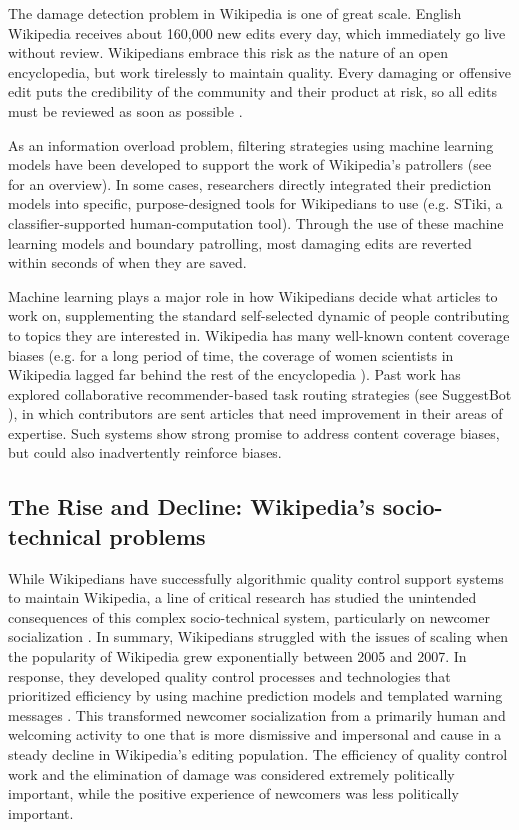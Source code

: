  The damage detection problem in Wikipedia is one of great scale.  English Wikipedia receives about 160,000 new edits every day, which immediately go live without review.  Wikipedians embrace this risk as the nature of an open encyclopedia, but work tirelessly to maintain quality. Every damaging or offensive edit puts the credibility of the community and their product at risk, so all edits must be reviewed as soon as possible \cite{geiger2010work}.

As an information overload problem, filtering strategies using machine learning models have been developed to support the work of Wikipedia's patrollers (see \cite{adler2011wikipedia} for an overview).  In some cases, researchers directly integrated their prediction models into specific, purpose-designed tools for Wikipedians to use (e.g. STiki\cite{west2010stiki}, a classifier-supported human-computation tool). Through the use of these machine learning models and boundary patrolling, most damaging edits are reverted within seconds of when they are saved\cite{geiger2013levee}.

Machine learning plays a major role in how Wikipedians decide what articles to work on, supplementing the standard self-selected dynamic of people contributing to topics they are interested in. Wikipedia has many well-known content coverage biases (e.g. for a long period of time, the coverage of women scientists in Wikipedia lagged far behind the rest of the encyclopedia \cite{halfaker2017interpolating}). Past work has explored collaborative recommender-based task routing strategies (see SuggestBot \cite{cosley2007suggestbot}), in which contributors are sent articles that need improvement in their areas of expertise. Such systems show strong promise to address content coverage biases, but could also inadvertently reinforce biases.

\subsection{The Rise and Decline: Wikipedia's socio-technical problems}
While Wikipedians have successfully algorithmic quality control support systems to maintain Wikipedia, a line of critical research has studied the unintended consequences of this complex socio-technical system, particularly on newcomer socialization  \cite{halfaker2013rise,morgan2013tea,halfaker2014snuggle}.  In summary, Wikipedians struggled with the issues of scaling when the popularity of Wikipedia grew exponentially between 2005 and 2007\cite{halfaker2013rise}.  In response, they developed quality control processes and technologies that prioritized efficiency by using machine prediction models \cite{halfaker2014snuggle} and templated warning messages \cite{halfaker2013rise}.  This transformed newcomer socialization from a primarily human and welcoming activity to one that is more dismissive and impersonal \cite{morgan2013tea} and cause in a steady decline in Wikipedia's editing population.  The efficiency of quality control work and the elimination of damage was considered extremely politically important, while the positive experience of newcomers was less politically important.

